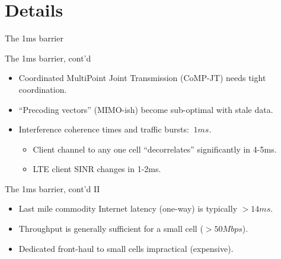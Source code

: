 \documentclass[xcolor=pdftex,dvipsnames,table]{beamer}
\begin{document}
\section{Details}

\begin{frame}{The 1ms barrier}
\end{frame}

\begin{frame}{The 1ms barrier, cont'd}
  \begin{itemize}
  \item Coordinated MultiPoint Joint Transmission (CoMP-JT) needs tight coordination.
  \item ``Precoding vectors'' (MIMO-ish) become sub-optimal with stale data.
  \item Interference coherence times and traffic bursts: $~1ms$.
    \begin{itemize}
    \item Client channel to any one cell ``decorrelates'' significantly in 4-5ms.
    \item LTE client SINR changes in 1-2ms.
    \end{itemize}
  \end{itemize}
\end{frame}

\begin{frame}{The 1ms barrier, cont'd II}
  \begin{itemize}
  \item Last mile commodity Internet latency (one-way) is typically $>14ms$.
  \item Throughput is generally sufficient for a small cell ($>50Mbps$).
  \item Dedicated front-haul to small cells impractical (expensive).
  \end{itemize}
\end{frame}
\end{document}
